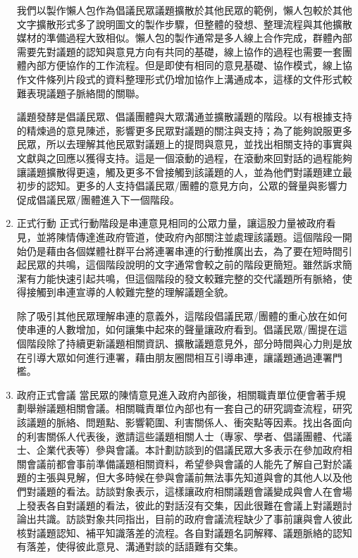 \documentclass[12pt,a4paper]{article}
\begin{document}
\begin{enumerate}
我們以製作懶人包作為倡議民眾議題擴散於其他民眾的範例，懶人包較於其他文字擴散形式多了說明圖文的製作步驟，但整體的發想、整理流程與其他擴散媒材的準備過程大致相似。懶人包的製作通常是多人線上合作完成，群體內部需要先對議題的認知與意見方向有共同的基礎，線上協作的過程也需要一套團體內部方便協作的工作流程。但是即使有相同的意見基礎、協作模式，線上協作文件條列片段式的資料整理形式仍增加協作上溝通成本，這樣的文件形式較難表現議題子脈絡間的關聯。

議題發酵是倡議民眾、倡議團體與大眾溝通並擴散議題的階段。以有根據支持的精煉過的意見陳述，影響更多民眾對議題的關注與支持；為了能夠說服更多民眾，所以去理解其他民眾對議題上的提問與意見，並找出相關支持的事實與文獻與之回應以獲得支持。這是一個滾動的過程，在滾動來回對話的過程能夠讓議題擴散得更遠，觸及更多不曾接觸到該議題的人，並為他們對議題建立最初步的認知。更多的人支持倡議民眾/團體的意見方向，公眾的聲量與影響力促成倡議民眾/團體進入下一個階段。
\item 正式行動
\label{sec:org0f39d17}
正式行動階段是串連意見相同的公眾力量，讓這股力量被政府看見，並將陳情傳達進政府管道，使政府內部關注並處理該議題。這個階段一開始仍是藉由各個媒體社群平台將連署串連的行動推廣出去，為了要在短時間引起民眾的共鳴，這個階段說明的文字通常會較之前的階段更簡短。雖然訴求簡潔有力能快速引起共鳴，但這個階段的發文較難完整的交代議題所有脈絡，使得接觸到串連宣導的人較難完整的理解議題全貌。

除了吸引其他民眾理解串連的意義外，這階段倡議民眾/團體的重心放在如何使串連的人數增加，如何讓集中起來的聲量讓政府看到。倡議民眾/團提在這個階段除了持續更新議題相關資訊、擴散議題意見外，部分時間與心力則是放在引導大眾如何進行連署，藉由朋友圈間相互引導串連，讓議題通過連署門檻。
\item 政府正式會議
\label{sec:orgee65fe7}
當民眾的陳情意見進入政府內部後，相關職責單位便會著手規劃舉辦議題相關會議。相關職責單位內部也有一套自己的研究調查流程，研究該議題的脈絡、問題點、影響範圍、利害關係人、衝突點等因素。找出各面向的利害關係人代表後，邀請這些議題相關人士（專家、學者、倡議團體、代議士、企業代表等）參與會議。本計劃訪談到的倡議民眾大多表示在參加政府相關會議前都會事前準備議題相關資料，希望參與會議的人能先了解自己對於議題的主張與見解，但大多時候在參與會議前無法事先知道與會的其他人以及他們對議題的看法。訪談對象表示，這樣讓政府相關議題會議變成與會人在會場上發表各自對議題的看法，彼此的對話沒有交集，因此很難在會議上對議題討論出共識。訪談對象共同指出，目前的政府會議流程缺少了事前讓與會人彼此核對議題認知、補平知識落差的流程。各自對議題名詞解釋、議題脈絡的認知有落差，使得彼此意見、溝通對談的話語難有交集。


\end{enumerate}
\end{document}
